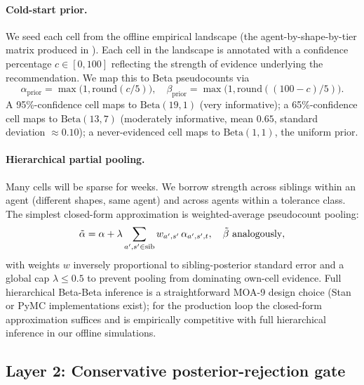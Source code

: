 \paragraph{Cold-start prior.}
We seed each cell from the offline empirical landscape (the
agent-by-shape-by-tier matrix produced in \cite{blackrim_moa1b}). Each cell
in the landscape is annotated with a confidence percentage $c \in [0, 100]$
reflecting the strength of evidence underlying the recommendation. We map
this to Beta pseudocounts via
\begin{equation}
  \alpha_{\mathrm{prior}} = \max\!\big(1, \mathrm{round}(c / 5)\big),
  \quad
  \beta_{\mathrm{prior}} = \max\!\big(1, \mathrm{round}((100 - c) / 5)\big).
  \label{eq:prior-from-confidence}
\end{equation}
A 95\%-confidence cell maps to $\mathrm{Beta}(19, 1)$ (very informative); a
65\%-confidence cell maps to $\mathrm{Beta}(13, 7)$ (moderately
informative, mean $0.65$, standard deviation $\approx 0.10$); a never-evidenced cell maps to $\mathrm{Beta}(1, 1)$, the
uniform prior.

\paragraph{Hierarchical partial pooling.}
Many cells will be sparse for weeks. We borrow strength across siblings
within an agent (different shapes, same agent) and across agents within a
tolerance class. The simplest closed-form approximation is weighted-average
pseudocount pooling:
\begin{equation}
  \tilde{\alpha} = \alpha + \lambda \sum_{a', s' \in \mathrm{sib}}
    w_{a',s'} \, \alpha_{a',s',t},
  \quad
  \tilde{\beta} \text{ analogously},
  \label{eq:pooling}
\end{equation}
with weights $w$ inversely proportional to sibling-posterior standard
error and a global cap $\lambda \leq 0.5$ to prevent pooling from dominating
own-cell evidence. Full hierarchical Beta-Beta inference is a
straightforward MOA-9 design choice (Stan \cite{carpenter2017stan} or PyMC
implementations exist); for the production loop the closed-form
approximation suffices and is empirically competitive with full
hierarchical inference in our offline simulations.

\subsection{Layer 2: Conservative posterior-rejection gate}
\label{sec:layer2}

